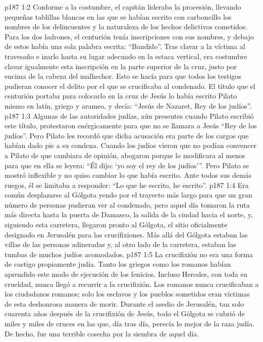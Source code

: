 \vs p187 1:2 Conforme a la costumbre, el capitán lideraba la procesión, llevando pequeñas tablillas blancas en las que se habían escrito con carboncillo los nombres de los delincuentes y la naturaleza de los hechos delictivos cometidos. Para los dos ladrones, el centurión tenía inscripciones con sus nombres, y debajo de estos había una sola palabra escrita: “Bandido”. Tras clavar a la víctima al travesaño e izarlo hasta su lugar adecuado en la estaca vertical, era costumbre clavar igualmente esta inscripción en la parte superior de la cruz, justo por encima de la cabeza del malhechor. Esto se hacía para que todos los testigos pudieran conocer el delito por el que se crucificaba al condenado. El título que el centurión portaba para colocarlo en la cruz de Jesús lo había escrito Pilato mismo en latín, griego y arameo, y decía: “Jesús de Nazaret, Rey de los judíos”.
\vs p187 1:3 Algunas de las autoridades judías, aún presentes cuando Pilato escribió este título, protestaron enérgicamente para que no se llamara a Jesús “Rey de los judíos”. Pero Pilato les recordó que dicha acusación era parte de los cargos que habían dado pie a su condena. Cuando los judíos vieron que no podían convencer a Pilato de que cambiara de opinión, abogaron porque lo modificara al menos para que en ella se leyera: “Él dijo: ‘yo soy el rey de los judíos’”. Pero Pilato se mostró inflexible y no quiso cambiar lo que había escrito. Ante todos sus demás ruegos, él se limitaba a responder: “Lo que he escrito, he escrito”.
\vs p187 1:4 Era común desplazarse al Gólgota yendo por el trayecto más largo para que un gran número de personas pudieran ver al condenado, pero aquel día tomaron la ruta más directa hasta la puerta de Damasco, la salida de la ciudad hacia el norte, y, siguiendo esta carretera, llegaron pronto al Gólgota, el sitio oficialmente designado en Jerusalén para las crucifixiones. Más allá del Gólgota estaban las villas de las personas adineradas y, al otro lado de la carretera, estaban las tumbas de muchos judíos acomodados.
\vs p187 1:5 \pc La crucifixión no era una forma de castigo propiamente judía. Tanto los griegos como los romanos habían aprendido este modo de ejecución de los fenicios. Incluso Herodes, con toda su crueldad, nunca llegó a recurrir a la crucifixión. Los romanos nunca crucificaban a los ciudadanos romanos; solo los esclavos y los pueblos sometidos eran víctimas de esta deshonrosa manera de morir. Durante el asedio de Jerusalén, tan solo cuarenta años después de la crucifixión de Jesús, todo el Gólgota se cubrió de miles y miles de cruces en las que, día tras día, perecía lo mejor de la raza judía. De hecho, fue una terrible cosecha por la siembra de aquel día.
